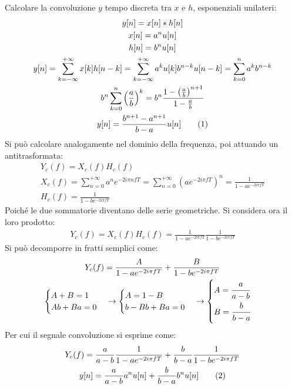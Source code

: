 \documentclass{article}
\newcommand{\tageq}{\tag{\stepcounter{equation}\theequation}}
\begin{document}
Calcolare la convoluzione $y$ tempo discreta tra $x$ e $h$, esponenziali unilateri: 
\begin{gather*}
    y[n]=x[n]*h[n]\\
    x[n]=a^nu[n]\\
    h[n]=b^nu[n]\\
    y[n]=\displaystyle\sum_{k=-\infty}^{+\infty}x[k]h[n-k]=\sum_{k=-\infty}^{+\infty}a^ku[k]b^{n-k}u[n-k]=\sum_{k=0}^na^kb^{n-k}\\
    \displaystyle b^n\sum_{k=0}^n\left(\frac{a}{b}\right)^k=b^n\frac{1-\left(\frac{a}{b}\right)^{n+1}}{1-\frac{a}{b}}\\
    y[n]=\displaystyle\frac{b^{n+1}-a^{n+1}}{b-a}u[n]\tageq
\end{gather*}
Si può calcolare analogamente nel dominio della frequenza, poi attuando un antitrasformata: 
\begin{gather*}
    Y_c(f)=X_c(f)H_c(f)\\
    X_c(f)=\displaystyle\sum_{n=0}^{+\infty}a^ne^{-2i\pi nfT}=\sum_{n=0}^{+\infty}\left(ae^{-2i\pi fT}\right)^n=\frac{1}{1-ae^{-2i\pi fT}}\\
    H_c(f)=\displaystyle\frac{1}{1-be^{-2i\pi fT}}
\end{gather*}
Poiché le due sommatorie diventano delle serie geometriche. Si considera ora il loro prodotto:
\begin{gather*}
    Y_c(f)=X_c(f)H_c(f)=\displaystyle\frac{1}{1-ae^{-2i\pi fT}}\frac{1}{1-be^{-2i\pi fT}}
\end{gather*}
Si può decomporre in fratti semplici come:
\begin{gather*}
    Y_c(f)=\displaystyle\frac{A}{1-ae^{-2i\pi fT}}+\frac{B}{1-be^{-2i\pi fT}}\\
    \begin{cases}
        A+B=1\\
        Ab+Ba=0
    \end{cases}\to
    \begin{cases}
        A=1-B\\
        b-Bb+Ba=0
    \end{cases}\to\begin{cases}
        A=\displaystyle\frac{\strut a}{\strut a-b}\\
        B=\displaystyle\frac{\strut b}{\strut b-a}
    \end{cases}
\end{gather*}
Per cui il segnale convoluzione si esprime come:
\begin{gather*}
    Y_c(f)=\displaystyle\frac{a}{a-b}\frac{1}{1-ae^{-2i\pi fT}}+\frac{b}{b-a}\frac{1}{1-be^{-2i\pi fT}}\\
    y[n]=\displaystyle\frac{a}{a-b}a^nu[n]+\displaystyle\frac{b}{b-a}b^nu[n]\tageq
\end{gather*}
\end{document}
